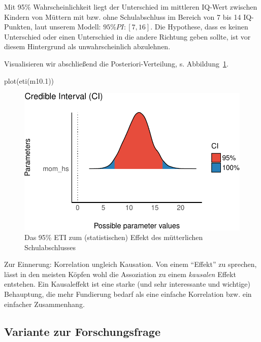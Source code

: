 \documentclass[
  a4paper,
  DIV=11]{scrreprt}
\newenvironment{Shaded}{\begin{snugshade}}{\end{snugshade}}
\newcommand{\FloatTok}[1]{\textcolor[rgb]{0.68,0.00,0.00}{#1}}
\newcommand{\FunctionTok}[1]{\textcolor[rgb]{0.28,0.35,0.67}{#1}}
\newcommand{\NormalTok}[1]{\textcolor[rgb]{0.00,0.23,0.31}{#1}}
\theoremstyle{definition}
\theoremstyle{remark}
\begin{document}
Mit 95\% Wahrscheinlichkeit liegt der Unterschied im mittleren IQ-Wert
zwischen Kindern von Müttern mit bzw. ohne Schulabschluss im Bereich von
7 bis 14 IQ-Punkten, laut unserem Modell: \(95\%PI: [7,16]\). Die
Hypothese, dass es keinen Unterschied oder einen Unterschied in die
andere Richtung geben sollte, ist vor diesem Hintergrund als
unwahrscheinlich abzulehnen.

Visualisieren wir abschließend die Posteriori-Verteilung, s.
Abbildung~\ref{fig-m101hdi}.

\begin{Shaded}
\begin{Highlighting}[]
\FunctionTok{plot}\NormalTok{(}\FunctionTok{eti}\NormalTok{(m10}\FloatTok{.1}\NormalTok{))}
\end{Highlighting}
\end{Shaded}

\begin{figure}[H]

{\centering \includegraphics{./metrische-AV_files/figure-pdf/fig-m101hdi-1.pdf}

}

\caption{\label{fig-m101hdi}Das 95\% ETI zum (statistischen) Effekt des
mütterlichen Schulabschlusses}

\end{figure}

Zur Einnerung: Korrelation ungleich Kausation. Von einem ``Effekt'' zu
sprechen, lässt in den meisten Köpfen wohl die Assoziation zu einem
\emph{kausalen} Effekt entstehen. Ein Kausaleffekt ist eine starke (und
sehr interessante und wichtige) Behauptung, die mehr Fundierung bedarf
als eine einfache Korrelation bzw. ein einfacher Zusammenhang.

\hypertarget{variante-zur-forschungsfrage}{%
\subsection{Variante zur
Forschungsfrage}\label{variante-zur-forschungsfrage}}
\end{document}
